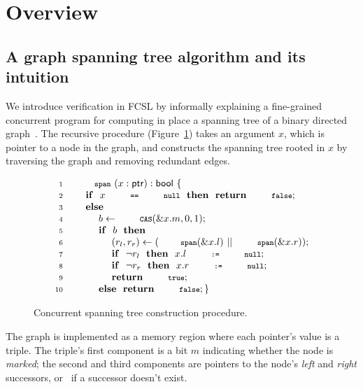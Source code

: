 
\section{Overview}
\label{sec:overview}

\subsection{A graph spanning tree algorithm and its intuition}
\label{sec:algorithm}
We introduce verification in FCSL by informally explaining a
fine-grained concurrent program for computing in place a spanning tree
of a binary directed
graph~\cite{Hobor-Villard:POPL13,Raad-al:colosl}. The recursive
procedure  (Figure~\ref{fig:span}) takes an argument $x$,
which is pointer to a node in the graph, and constructs the spanning
tree rooted in $x$ by traversing the graph and removing redundant
edges.

{
\setlength{\belowcaptionskip}{-10pt} 
\begin{figure}
\centering
{\small{
\[
\begin{array}{rl}
\Num{1} & \esc{span}~(x : \tp{ptr}) : \tp{bool}~\{ 
\\ 
\Num{2} & ~~~~ \kw{if}~~x~\esc{==}~\esc{null}~~\kw{then}~~\kw{return}~\esc{false};    
\\
\Num{3} & ~~~~ \kw{else} \\
\Num{4} & ~~~~ ~~~~ b \Asgn \esc{CAS}(\&x.m, 0, 1); \\ 
\Num{5} &~~~~  ~~~~ \kw{if}~~b~~\kw{then} \\
\Num{6} & ~~~~ ~~~~ ~~~~ (r_l, r_r) \Asgn(\esc{span}(\&x.l)~||~\esc{span}(\&x.r)); \\
\Num{7} & ~~~~ ~~~~ ~~~~ \kw{if}~~\neg{}r_l~~\kw{then}~~x.l~\esc{:=}~\esc{null};  \\
\Num{8} & ~~~~ ~~~~ ~~~~ \kw{if}~~\neg{}r_r~~\kw{then}~~x.r~\esc{:=}~\esc{null};  \\
\Num{9} & ~~~~ ~~~~ ~~~~ \kw{return}~\esc{true};\\
\Num{10} & ~~~~ ~~~~ \kw{else}~~\kw{return}~\esc{false}; \}
\end{array}
\]
\vspace{-10pt}  
}}
\caption{Concurrent spanning tree construction procedure.}
\label{fig:span}
\end{figure} 
}

The graph is implemented as a memory region where each pointer's value
is a triple. The triple's first component is a bit $m$ indicating
whether the node is \emph{marked}; the second and third components are
pointers to the node's \emph{left} and \emph{right} successors,
or~ if a successor doesn't exist.

